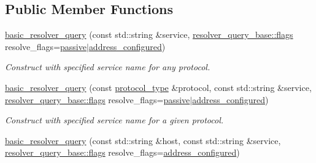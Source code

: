 \subsection*{Public Member Functions}
\begin{DoxyCompactItemize}
\item 
\hyperlink{classasio_1_1ip_1_1basic__resolver__query_aa183a3ff114b6508a52112b72ba9e94f}{basic\+\_\+resolver\+\_\+query} (const std\+::string \&service, \hyperlink{classasio_1_1ip_1_1resolver__query__base_a458691242de07dc542fd9834f7b15cfe}{resolver\+\_\+query\+\_\+base\+::flags} resolve\+\_\+flags=\hyperlink{classasio_1_1ip_1_1resolver__query__base_a458691242de07dc542fd9834f7b15cfea2b72b18f2bf20dd05242e133e3a6cb79}{passive}$\vert$\hyperlink{classasio_1_1ip_1_1resolver__query__base_a458691242de07dc542fd9834f7b15cfea72387a0c1a4eec494d376e28fefa7b8d}{address\+\_\+configured})
\begin{DoxyCompactList}\small\item\em Construct with specified service name for any protocol. \end{DoxyCompactList}\item 
\hyperlink{classasio_1_1ip_1_1basic__resolver__query_a017da1f4f24366b7edb68dd9f716ee0b}{basic\+\_\+resolver\+\_\+query} (const \hyperlink{classasio_1_1ip_1_1basic__resolver__query_afc47f8001caf9274f6f567ae541e224a}{protocol\+\_\+type} \&protocol, const std\+::string \&service, \hyperlink{classasio_1_1ip_1_1resolver__query__base_a458691242de07dc542fd9834f7b15cfe}{resolver\+\_\+query\+\_\+base\+::flags} resolve\+\_\+flags=\hyperlink{classasio_1_1ip_1_1resolver__query__base_a458691242de07dc542fd9834f7b15cfea2b72b18f2bf20dd05242e133e3a6cb79}{passive}$\vert$\hyperlink{classasio_1_1ip_1_1resolver__query__base_a458691242de07dc542fd9834f7b15cfea72387a0c1a4eec494d376e28fefa7b8d}{address\+\_\+configured})
\begin{DoxyCompactList}\small\item\em Construct with specified service name for a given protocol. \end{DoxyCompactList}\item 
\hyperlink{classasio_1_1ip_1_1basic__resolver__query_a5bd1cb4719e72cfd850a9ba31875b7b3}{basic\+\_\+resolver\+\_\+query} (const std\+::string \&host, const std\+::string \&service, \hyperlink{classasio_1_1ip_1_1resolver__query__base_a458691242de07dc542fd9834f7b15cfe}{resolver\+\_\+query\+\_\+base\+::flags} resolve\+\_\+flags=\hyperlink{classasio_1_1ip_1_1resolver__query__base_a458691242de07dc542fd9834f7b15cfea72387a0c1a4eec494d376e28fefa7b8d}{address\+\_\+configured})

\end{DoxyCompactItemize}
